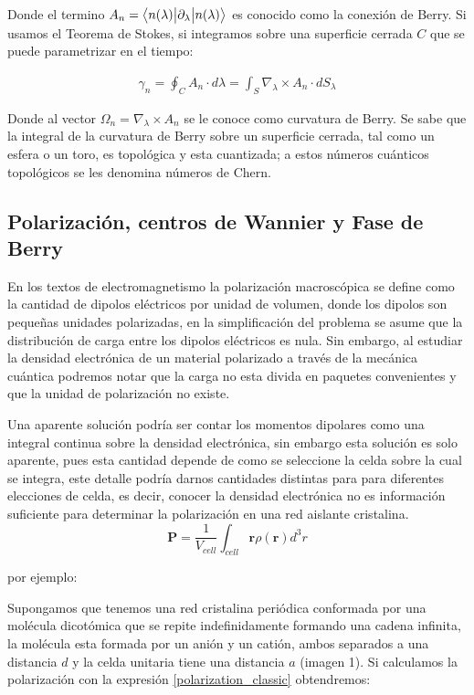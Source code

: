 Donde el termino $A_n = \big \langle{n(\lambda)}\big | {\partial_\lambda} \big | {n(\lambda)} \big \rangle$ es conocido como la conexión de Berry. Si usamos el Teorema de Stokes, si integramos sobre una superficie cerrada $C$ que se puede parametrizar en el tiempo:

\begin{align}
    \gamma_n = \oint_C A_n \cdot d\lambda = \int_S \nabla_\lambda \times A_n \cdot dS_\lambda
\end{align}


Donde al vector $\Omega_n = \nabla_\lambda \times A_n$ se le conoce como curvatura de Berry. Se sabe que la integral de la curvatura de Berry sobre un superficie cerrada, tal como un esfera o un toro, es topológica y esta cuantizada; a estos números cuánticos topológicos se les denomina números de Chern.

\subsection{Polarización, centros de Wannier y Fase de Berry}

En los textos de electromagnetismo la polarización macroscópica se define como la cantidad de dipolos eléctricos por unidad de volumen, donde los dipolos son pequeñas unidades polarizadas, en la simplificación del problema se asume que la distribución de carga entre los dipolos eléctricos es nula. Sin embargo, al estudiar la densidad electrónica de un material polarizado a través de la mecánica cuántica podremos notar que la carga no esta divida en paquetes convenientes y que la unidad de polarización no existe. 

Una aparente solución podría ser contar los momentos dipolares como una integral continua sobre la densidad electrónica, sin embargo esta solución es solo aparente, pues esta cantidad depende de como se seleccione la celda sobre la cual se integra, este detalle podría darnos cantidades distintas para para diferentes elecciones de celda, es decir, conocer la densidad electrónica no es información suficiente para determinar la polarización en una red aislante cristalina.
\begin{equation}
\label{polarization_classic}
\textbf{P} = \frac{1}{V_{cell}}\int_{cell} \textbf{r} \rho(\textbf{r})d^3r
\end{equation}

por ejemplo:

Supongamos que tenemos una red cristalina periódica conformada por una molécula dicotómica que se repite indefinidamente formando una cadena infinita, la molécula esta formada por un anión y un catión, ambos separados a una distancia $d$ y la celda unitaria tiene una distancia $a$ (imagen 1). Si calculamos la polarización con la expresión \ref{polarization_classic} obtendremos:

